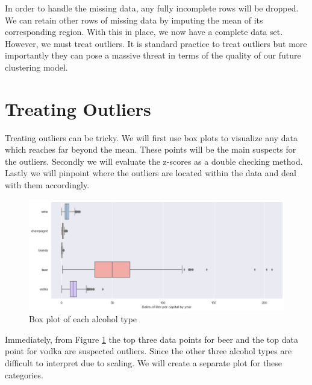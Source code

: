\documentclass{article}
\begin{document}
\noindent In order to handle the missing data, any fully incomplete rows will be dropped. We can retain other rows of missing data by imputing the mean of its corresponding region. With this in place, we now have a complete data set. However, we must treat outliers. It is standard practice to treat outliers but more importantly they can pose a massive threat in terms of the quality of our future clustering model.

\section{Treating Outliers}
Treating outliers can be tricky. We will first use box plots to visualize any data which reaches far beyond the mean. These points will be the main suspects for the outliers. Secondly we will evaluate the z-scores as a double checking method. Lastly we will pinpoint where the outliers are located within the data and deal with them accordingly.

\begin{figure}[!htb]
    \centering
    \includegraphics[scale = .4]{BoxploTs/output_18_1.png}
    \caption{Box plot of each alcohol type}
    \label{fig:box_plot_1}
\end{figure}
\noindent Immediately, from Figure \ref{fig:box_plot_1} the top three data points for beer and the top data point for vodka are suspected outliers. Since the other three alcohol types are difficult to interpret due to scaling. We will create a separate plot for these categories.\newline
\end{document}
